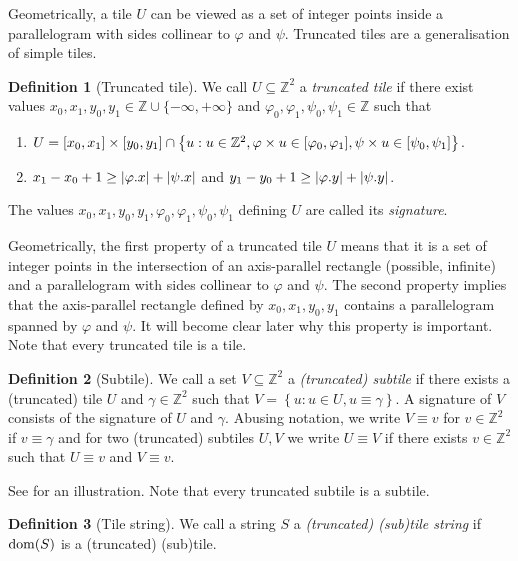 \documentclass[11pt, letterpaper]{article}
\theoremstyle{plain}
\theoremstyle{definition}
\newtheorem{definition}{Definition}
\theoremstyle{remark}
\newcommand{\Z}{\mathbb{Z}}
\renewcommand{\phi}{\varphi}
\newcommand{\set}[1]{\left\lbrace #1 \right\rbrace}
\newcommand{\absolute}[1]{\left\lvert#1\right\rvert}
\begin{document}
Geometrically, a tile $U$ can be viewed as a set of integer points inside a parallelogram with sides collinear to $\phi$ and $\psi$. Truncated tiles are a generalisation of simple tiles. 

\begin{definition}[Truncated tile]
We call $U \subseteq \Z^2$ a \emph{truncated tile} if there exist values $x_0, x_1, y_0, y_1 \in \Z \cup \{-\infty, +\infty\}$ and $\phi_0, \phi_1, \psi_0, \psi_1 \in \Z$ such that 
	\begin{enumerate}
		\item $U = [x_0, x_1] \times [y_0, y_1] \cap \set{u : u \in \Z^2, \h{u} \in [\phi_0, \phi_1], \s{u} \in [\psi_0, \psi_1]}$. 
		\item $x_1 - x_0 + 1 \ge \absolute{\x{\phi}} + \absolute{\x{\psi}}$ and $y_1 - y_0 + 1 \ge \absolute{\y{\phi}} + \absolute{\y{\psi}}$. 
	\end{enumerate}
The values $x_0, x_1, y_0, y_1, \phi_0, \phi_1, \psi_0, \psi_1$ defining $U$ are called its \emph{signature}. 
\end{definition}

Geometrically, the first property of a truncated tile $U$ means that it is a set of integer points in the intersection of an axis-parallel rectangle (possible, infinite) and a parallelogram with sides collinear to $\phi$ and $\psi$. The second property implies that the axis-parallel rectangle defined by $x_0, x_1, y_0, y_1$ contains a parallelogram spanned by $\phi$ and $\psi$. It will become clear later why this property is important. Note that every truncated tile is a tile.

\begin{definition}[Subtile]\label{subtile_definition}
We call a set $V \subseteq \Z^2$ a \emph{(truncated) subtile} if there exists a (truncated) tile $U$ and $\gamma \in \Z^2$ such that $V = \set{u : u \in U, u \equiv \gamma}$. A signature of $V$ consists of the signature of $U$ and $\gamma$. Abusing notation, we write $V \equiv v$ for $v \in \Z^2$ if $v \equiv \gamma$ and for two (truncated) subtiles $U,V$ we write $U \equiv V$ if there exists $v \in \Z^2$ such that $U \equiv v$ and $V \equiv v$.
\end{definition}

See  for an illustration. Note that every truncated subtile is a subtile.

\begin{definition}[Tile string]\label{tile_string_definition}
We call a string $S$ a \emph{(truncated) (sub)tile string} if $\operatorname*{dom}(S)$ is a (truncated) (sub)tile.
\end{definition}
\end{document}

